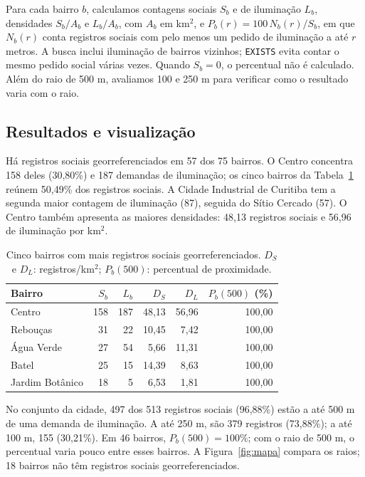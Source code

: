 \documentclass[12pt]{article}
\begin{document}
Para cada bairro $b$, calculamos contagens sociais $S_b$ e de iluminação $L_b$,
densidades $S_b/A_b$ e $L_b/A_b$, com $A_b$ em km$^2$, e
\(P_b(r)=100\,N_b(r)/S_b\), em que $N_b(r)$ conta registros sociais com pelo
menos um pedido de iluminação a até $r$ metros. A busca inclui iluminação de
bairros vizinhos; \texttt{EXISTS} evita contar o mesmo pedido social várias
vezes. Quando $S_b=0$, o percentual não é calculado. Além do raio de 500 m,
avaliamos 100 e 250 m para verificar como o resultado varia com o raio.

\subsection{Resultados e visualização}
Há registros sociais georreferenciados em 57 dos 75 bairros. O Centro concentra
158 deles (30,80\%) e 187 demandas de iluminação; os cinco bairros da
Tabela~\ref{tab:ranking} reúnem 50,49\% dos registros sociais. A Cidade
Industrial de Curitiba tem a segunda maior contagem de iluminação (87), seguida
do Sítio Cercado (57). O Centro também apresenta as maiores densidades:
48,13 registros sociais e 56,96 de iluminação por km$^2$.

\begin{table}[htbp]
\centering
\caption{Cinco bairros com mais registros sociais georreferenciados.
$D_S$ e $D_L$: registros/km$^2$; $P_b(500)$: percentual de proximidade.}
\label{tab:ranking}
\small
\begin{tabular}{lrrrrr}
\toprule
Bairro & $S_b$ & $L_b$ & $D_S$ & $D_L$ & $P_b(500)$ (\%) \\
\midrule
Centro & 158 & 187 & 48,13 & 56,96 & 100,00 \\
Rebouças & 31 & 22 & 10,45 & 7,42 & 100,00 \\
Água Verde & 27 & 54 & 5,66 & 11,31 & 100,00 \\
Batel & 25 & 15 & 14,39 & 8,63 & 100,00 \\
Jardim Botânico & 18 & 5 & 6,53 & 1,81 & 100,00 \\
\bottomrule
\end{tabular}
\end{table}

No conjunto da cidade, 497 dos 513 registros sociais (96,88\%) estão a até
500 m de uma demanda de iluminação. A até 250 m, são 379 registros (73,88\%);
a até 100 m, 155 (30,21\%). Em 46 bairros, $P_b(500)=100\%$; com o raio de
500 m, o percentual varia pouco entre esses bairros. A Figura~\ref{fig:mapa}
compara os raios; 18 bairros não têm
registros sociais georreferenciados.
\end{document}
